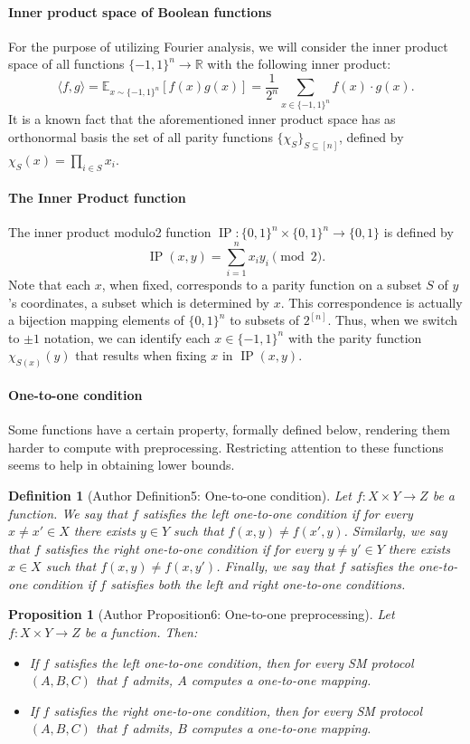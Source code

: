 \documentclass[10pt,a4paper]{article}
\newtheorem{ntdefinition}[nttheorem]{Definition}
\newtheorem{ntproposition}[nttheorem]{Proposition}
\begin{document}
\paragraph{Inner product space of Boolean functions}
For the purpose of utilizing Fourier analysis, we will consider the inner product space of all functions $\{-1,1\}^n\to\mathbb R$ with the following inner product:
\[\langle f,g\rangle=\mathbb E_{x\sim\{-1,1\}^n}[f(x)g(x)]=\frac1{2^n}\sum_{x\in\{-1,1\}^n}f(x)\cdot g(x).\]
It is a known fact that the aforementioned inner product space has as orthonormal basis the set of all parity functions $\{\chi_S\}_{S\subseteq[n]}$, defined by $\chi_S(x)=\prod_{i\in S}x_i$.
\paragraph{The Inner Product function}
The inner product modulo2 function $\operatorname{IP}:\{0,1\}^n\times\{0,1\}^n\to\{0,1\}$ is defined by
\[\operatorname{IP}(x,y)=\sum_{i=1}^nx_iy_i\pmod2.\]
Note that each $x$, when fixed, corresponds to a parity function on a subset $S$ of $y$'s coordinates, a subset which is determined by $x$. This correspondence is actually a bijection mapping elements of $\{0,1\}^n$ to subsets of $2^{[n]}$. Thus, when we switch to $\pm1$ notation, we can identify each $x\in\{-1,1\}^n$ with the parity function $\chi_{S(x)}(y)$ that results when fixing $x$ in $\operatorname{IP}(x,y)$.
\paragraph{One-to-one condition}
Some functions have a certain property, formally defined below, rendering them harder to compute with preprocessing. Restricting attention to these functions seems to help in obtaining lower bounds.
\begin{ntdefinition}[Author Definition5: One-to-one condition]
Let $f:X\times Y\to Z$ be a function. We say that $f$ satisfies the left one-to-one condition if for every $x\ne x'\in X$ there exists $y\in Y$ such that $f(x,y)\ne f(x',y)$. Similarly, we say that $f$ satisfies the right one-to-one condition if for every $y\ne y'\in Y$ there exists $x\in X$ such that $f(x,y)\ne f(x,y')$. Finally, we say that $f$ satisfies the one-to-one condition if $f$ satisfies both the left and right one-to-one conditions.
\end{ntdefinition}
\begin{ntproposition}[Author Proposition6: One-to-one preprocessing]
Let $f:X\times Y\to Z$ be a function. Then:
\begin{itemize}
\item If $f$ satisfies the left one-to-one condition, then for every SM protocol $(A,B,C)$ that $f$ admits, $A$ computes a one-to-one mapping.
\item If $f$ satisfies the right one-to-one condition, then for every SM protocol $(A,B,C)$ that $f$ admits, $B$ computes a one-to-one mapping.
\end{itemize}
\end{ntproposition}
\end{document}
